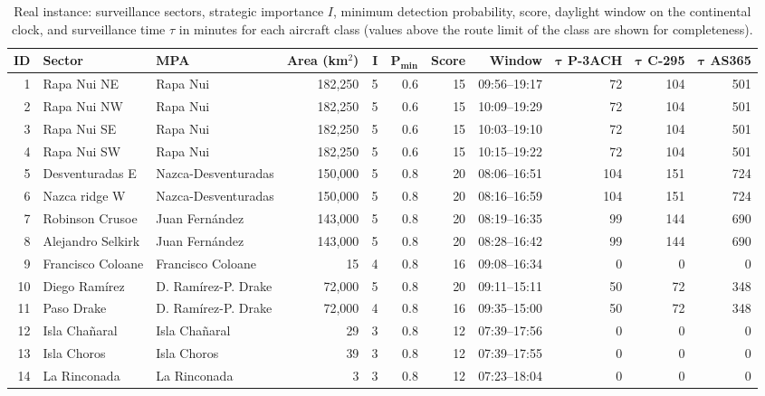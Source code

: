 \begin{table}[!ht]
\centering
\caption{Real instance: surveillance sectors, strategic importance $I$, minimum detection probability, score, daylight window on the continental clock, and surveillance time $\tau$ in minutes for each aircraft class (values above the route limit of the class are shown for completeness).\label{tab6}}
\footnotesize\setlength{\tabcolsep}{3pt}
\begin{tabular*}{\textwidth}{@{\extracolsep\fill}rllrrrrrrrr@{\extracolsep\fill}}
\toprule
\textbf{ID} & \textbf{Sector} & \textbf{MPA} & \textbf{Area (km$^2$)} & $\boldsymbol{I}$ & $\boldsymbol{P_{\min}}$ & \textbf{Score} & \textbf{Window} & $\boldsymbol{\tau}$ \textbf{P-3ACH} & $\boldsymbol{\tau}$ \textbf{C-295} & $\boldsymbol{\tau}$ \textbf{AS365} \\
\midrule
1 & Rapa Nui NE & Rapa Nui & 182,250 & 5 & 0.6 & 15 & 09:56--19:17 & 72 & 104 & 501 \\
2 & Rapa Nui NW & Rapa Nui & 182,250 & 5 & 0.6 & 15 & 10:09--19:29 & 72 & 104 & 501 \\
3 & Rapa Nui SE & Rapa Nui & 182,250 & 5 & 0.6 & 15 & 10:03--19:10 & 72 & 104 & 501 \\
4 & Rapa Nui SW & Rapa Nui & 182,250 & 5 & 0.6 & 15 & 10:15--19:22 & 72 & 104 & 501 \\
5 & Desventuradas E & Nazca-Desventuradas & 150,000 & 5 & 0.8 & 20 & 08:06--16:51 & 104 & 151 & 724 \\
6 & Nazca ridge W & Nazca-Desventuradas & 150,000 & 5 & 0.8 & 20 & 08:16--16:59 & 104 & 151 & 724 \\
7 & Robinson Crusoe & Juan Fern\'andez & 143,000 & 5 & 0.8 & 20 & 08:19--16:35 & 99 & 144 & 690 \\
8 & Alejandro Selkirk & Juan Fern\'andez & 143,000 & 5 & 0.8 & 20 & 08:28--16:42 & 99 & 144 & 690 \\
9 & Francisco Coloane & Francisco Coloane & 15 & 4 & 0.8 & 16 & 09:08--16:34 & 0 & 0 & 0 \\
10 & Diego Ram\'irez & D. Ram\'irez-P. Drake & 72,000 & 5 & 0.8 & 20 & 09:11--15:11 & 50 & 72 & 348 \\
11 & Paso Drake & D. Ram\'irez-P. Drake & 72,000 & 4 & 0.8 & 16 & 09:35--15:00 & 50 & 72 & 348 \\
12 & Isla Cha\~naral & Isla Cha\~naral & 29 & 3 & 0.8 & 12 & 07:39--17:56 & 0 & 0 & 0 \\
13 & Isla Choros & Isla Choros & 39 & 3 & 0.8 & 12 & 07:39--17:55 & 0 & 0 & 0 \\
14 & La Rinconada & La Rinconada & 3 & 3 & 0.8 & 12 & 07:23--18:04 & 0 & 0 & 0 \\
\bottomrule
\end{tabular*}
\end{table}
